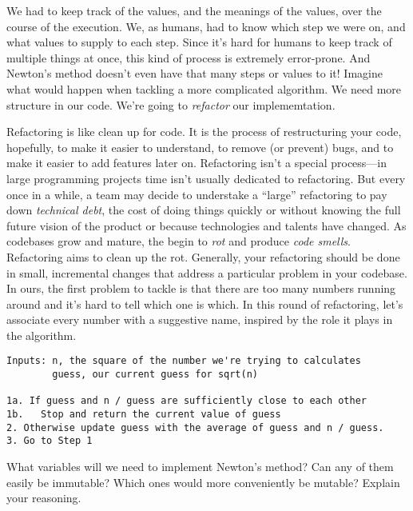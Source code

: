 We had to keep track of the values, and the meanings of the values, over the
course of the execution. We, as humans, had to know which step we were on, and
what values to supply to each step. Since it's hard for humans to keep track of
multiple things at once, this kind of process is extremely error-prone. And
Newton's method doesn't even have that many steps or values to it! Imagine what
would happen when tackling a more complicated algorithm. We need more structure
in our code. We're going to \emph{refactor} our implememtation.

Refactoring is like clean up for code. It is the process of restructuring your
code, hopefully, to make it easier to understand, to remove (or prevent) bugs,
and to make it easier to add features later on. Refactoring isn't a special
process---in large programming projects time isn't usually dedicated to
refactoring. But every once in a while, a team may decide to understake a
``large'' refactoring to pay down \emph{technical debt}, the cost of doing
things quickly or without knowing the full future vision of the product or
because technologies and talents have changed. As codebases grow and mature, the
begin to \emph{rot} and produce \emph{code smells}. Refactoring aims to clean up
the rot.
Generally, your refactoring should be done in small, incremental changes that
address a particular problem in your codebase. In ours, the first problem to
tackle is that there are too many numbers running around and it's hard to tell
which one is which. In this round of refactoring, let's associate every number
with a suggestive name, inspired by the role it plays in the algorithm.


\begin{lstlisting}[caption={Newton's method for calculating square roots,
reprinted for your convenience.}]
Inputs: n, the square of the number we're trying to calculates
        guess, our current guess for sqrt(n)

1a. If guess and n / guess are sufficiently close to each other
1b.   Stop and return the current value of guess
2. Otherwise update guess with the average of guess and n / guess.
3. Go to Step 1
\end{lstlisting}

\begin{question}
What variables will we need to implement Newton's method? Can any of them easily
be immutable? Which ones would more conveniently be mutable? Explain your
reasoning.
\end{question}


